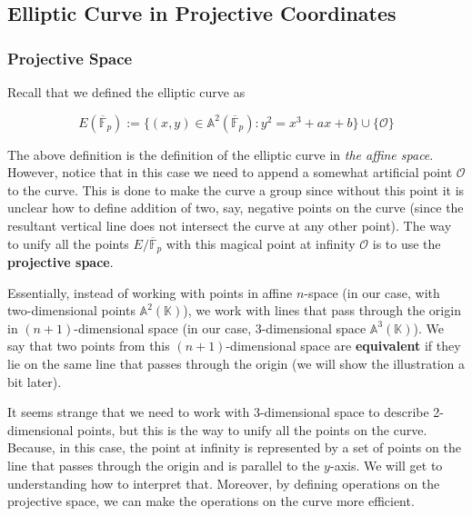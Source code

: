 \documentclass[../lecture-notes.tex]{subfiles}
\begin{document}
\subsection{Elliptic Curve in Projective Coordinates}
\subsubsection{Projective Space}

Recall that we defined the elliptic curve as 

\vspace{-3mm}

\begin{equation*}    
    E(\overline{\mathbb{F}}_p) := \{(x,y) \in \mathbb{A}^2(\overline{\mathbb{F}}_p): y^2 = x^3+ax+b\} \cup \{\mathcal{O}\}
\end{equation*}


The above definition is the definition of the elliptic curve in \textit{the affine space}. However, notice that in this case 
we need to append a somewhat artificial point $\mathcal{O}$ to the curve. This is done to make the curve a group since without 
this point it is unclear how to define addition of two, say, negative points on the curve (since the resultant vertical line
does not intersect the curve at any other point). The way to unify all the points $E/\overline{\mathbb{F}}_p$ with this 
magical point at infinity $\mathcal{O}$ is to use the \textbf{projective space}.

Essentially, instead of working with points in affine $n$-space (in our case, with two-dimensional points $\mathbb{A}^2(\mathbb{K})$), we work with lines that pass through the origin in 
$(n+1)$-dimensional space (in our case, 3-dimensional space $\mathbb{A}^3(\mathbb{K})$). We say that two points from this $(n+1)$-dimensional space are \textbf{equivalent} if they lie on the same line that passes through the origin (we will show the illustration a bit later). 

It seems strange that we need to work with 3-dimensional space to describe 2-dimensional points, but this is the way to unify all the points on the curve. Because, in this case, the point at infinity is represented by a set of points on the line that passes through the origin and is parallel to the
$y$-axis. We will get to understanding how to interpret that. Moreover, by defining operations on the projective space, we can make the operations on the curve more efficient.
\end{document}
